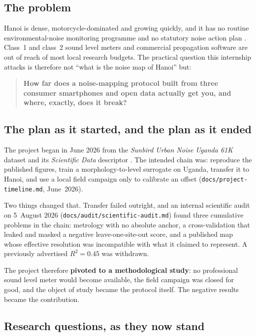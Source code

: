 \documentclass[11pt,a4paper]{article}
\newcommand{\pth}[1]{\texttt{\small #1}}
\begin{document}
\subsection{The problem}

Hanoi is dense, motorcycle-dominated and growing quickly, and it has no routine
environmental-noise monitoring programme and no statutory noise action plan
\citep{nguyen2025law}. Class~1 and class~2 sound level meters and commercial
propagation software are out of reach of most local research budgets. The
practical question this internship attacks is therefore not ``what is the noise
map of Hanoi'' but:

\begin{quote}
\textbf{How far does a noise-mapping protocol built from three consumer
smartphones and open data actually get you, and where, exactly, does it
break?}
\end{quote}

\subsection{The plan as it started, and the plan as it ended}

The project began in June 2026 from the \emph{Sunbird Urban Noise Uganda 61K}
dataset and its \emph{Scientific Data} descriptor \citep{nsumba2026sunbird}. The
intended chain was: reproduce the published figures, train a
morphology-to-level surrogate on Uganda, transfer it to Hanoi, and use a local
field campaign only to calibrate an offset
(\pth{docs/project-timeline.md}, June~2026).

Two things changed that. Transfer failed outright, and an internal scientific
audit on 5~August 2026 (\pth{docs/audit/scientific-audit.md}) found three
cumulative problems in the chain: metrology with no absolute anchor, a
cross-validation that leaked and masked a negative leave-one-site-out score, and
a published map whose effective resolution was incompatible with what it claimed
to represent. A previously advertised $R^2 = 0.45$ was withdrawn.

The project therefore \textbf{pivoted to a methodological study}: no professional
sound level meter would become available, the field campaign was closed for good,
and the object of study became the protocol itself. The negative results became
the contribution.

\subsection{Research questions, as they now stand}
\end{document}
